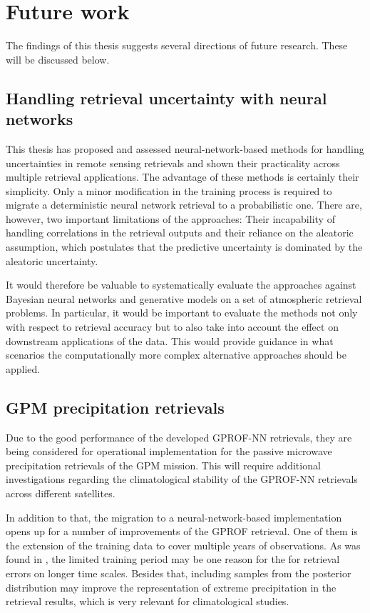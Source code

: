 \section{Future work}

The findings of this thesis suggests several directions of future research.
These will be discussed below.

\subsection{Handling retrieval uncertainty with neural networks}

This thesis has proposed and assessed neural-network-based methods for handling
uncertainties in remote sensing retrievals and shown their practicality across
multiple retrieval applications. The advantage of these methods is certainly
their simplicity. Only a minor modification in the training process is required
to migrate a deterministic neural network retrieval to a probabilistic one.
There are, however, two important limitations of the approaches: Their
incapability of handling correlations in the retrieval outputs and their
reliance on the aleatoric assumption, which postulates that the predictive
uncertainty is dominated by the aleatoric uncertainty.

It would therefore be valuable to systematically evaluate the approaches against
Bayesian neural networks and generative models on a set of atmospheric retrieval
problems. In particular, it would be important to evaluate the methods not only
with respect to retrieval accuracy but to also take into account the effect on
downstream applications of the data. This would provide guidance in what
scenarios the computationally more complex alternative approaches should be
applied.

\subsection{GPM precipitation retrievals}

Due to the good performance of the developed GPROF-NN retrievals, they are being
considered for operational implementation for the passive microwave
precipitation retrievals of the GPM mission. This will require additional
investigations regarding the climatological stability of the GPROF-NN retrievals
across different satellites.

In addition to that, the migration to a neural-network-based implementation
opens up for a number of improvements of the GPROF retrieval. One of them is the
extension of the training data to cover multiple years of observations. As was
found in \citep{pfreundschuh22d}, the limited training period may be one reason
for the for retrieval errors on longer time scales. Besides that, including
samples from the posterior distribution may improve the representation of
extreme precipitation in the retrieval results, which is very relevant for
climatological studies.

